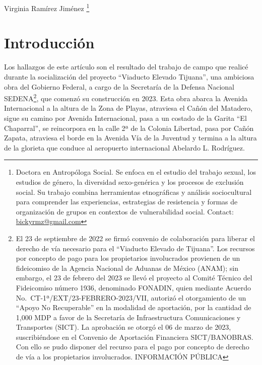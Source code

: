 \documentclass[
  spanish,
  11pt,
  a4paper,
]{scrbook}
\begin{document}
\begin{flushright}
\Large Virginia Ramírez Jiménez \footnote{Doctora en Antropóloga Social. Se enfoca en el estudio del trabajo sexual, los estudios de género, la diversidad sexo-genérica y los procesos de exclusión social. Su trabajo combina herramientas etnográficas y análisis sociocultural para comprender las experiencias, estrategias de resistencia y formas de organización de grupos en contextos de vulnerabilidad social. Contact: \href{bickyrmz@gmail.com}{bickyrmz@gmail.com}}
\end{flushright}

\section*{Introducción}\label{introducciuxf3n-4}


Los hallazgos de este artículo son el resultado del trabajo de campo que
realicé durante la socialización del proyecto ``Viaducto Elevado
Tijuana'', una ambiciosa obra del Gobierno Federal, a cargo de la
Secretaría de la Defensa Nacional SEDENA\footnote{El 23 de septiembre de
  2022 se firmó convenio de colaboración para liberar el derecho de vía
  necesario para el ``Viaducto Elevado de Tijuana''. Los recursos por
  concepto de pago para los propietarios involucrados provienen de un
  fideicomiso de la Agencia Nacional de Aduanas de México (ANAM); sin
  embargo, el 23 de febrero del 2023 se llevó el proyecto al Comité
  Técnico del Fideicomiso número 1936, denominado FONADIN, quien
  mediante Acuerdo No.~CT-1ª/EXT/23-FEBRERO-2023/VII, autorizó el
  otorgamiento de un ``Apoyo No Recuperable'' en la modalidad de
  aportación, por la cantidad de 1,000 MDP a favor de la Secretaría de
  Infraestructura Comunicaciones y Transportes (SICT). La aprobación se
  otorgó el 06 de marzo de 2023, suscribiéndose en el Convenio de
  Aportación Financiera SICT/BANOBRAS. Con ello se pudo disponer del
  recurso para el pago por concepto de derecho de vía a los propietarios
  involucrados. INFORMACIÓN PÚBLICA}, que comenzó su construcción en
2023. Esta obra abarca la Avenida Internacional a la altura de la Zona
de Playas, atraviesa el Cañón del Matadero, sigue su camino por Avenida
Internacional, pasa a un costado de la Garita ``El Chaparral'', se
reincorpora en la calle 2ª de la Colonia Libertad, pasa por Cañón
Zapata, atraviesa el borde en la Avenida Vía de la Juventud y termina a
la altura de la glorieta que conduce al aeropuerto internacional
Abelardo L. Rodríguez.
\end{document}
